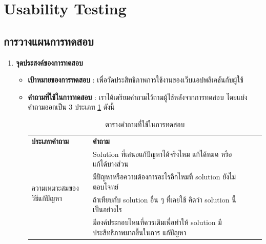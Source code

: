 \section{Usability Testing}
\subsection{การวางแผนการทดสอบ}
\begin{enumerate}
    \item \textbf{จุดประสงค์ของการทดสอบ}
          \begin{itemize}
              \item \textbf{เป้าหมายของการทดสอบ} : เพื่อวัดประสิทธิภาพการใช้งานของเว็บแอปพลิเคชันกับผู้ใช้
              \item \textbf{คำถามที่ใช้ในการทดสอบ} : เราได้เตรียมคำถามไว้ถามผู้ใช้หลังจากการทดสอบ โดยแบ่งคำถามออกเป็น 3 ประเภท \ref{tab:question-table} ดังนี้
                    \begin{table}[H]
                        \caption{ตารางคำถามที่ใช้ในการทดสอบ}
                        \label{tab:question-table}
                        \begin{tabularx}{\textwidth}{|l|X|lll}
                            \cline{1-2}
                            \textbf{ประเภทคำถาม}                        & \textbf{คำถาม}                                                                  &  &  & \\ \cline{1-2}
                            \multirow[t]{5}{*}{ความเหมาะสมของวิธีแก้ปัญหา} & Solution ที่เสนอแก้ปัญหาได้จริงไหม แก้ได้หมด หรือแก้ได้บางส่วน                             &  &  & \\ \cline{2-2}
                                                                       & มีปัญหาหรือความต้องการอะไรอีกไหมที่ solution ยังไม่ตอบโจทย์                              &  &  & \\ \cline{2-2}
                                                                       & ถ้าเทียบกับ solution อื่น ๆ ที่เคยใช้ คิดว่า solution นี้เป็นอย่างไร                         &  &  & \\ \cline{2-2}
                                                                       & มีองค์ประกอบไหนที่ควรเติมเพื่อทำให้ solution มีประสิทธิภาพมากขึ้นในการ แก้ปัญหา                &  &  & \\ \cline{2-2}

\end{tabularx}
\end{table}
\end{itemize}
\end{enumerate}
